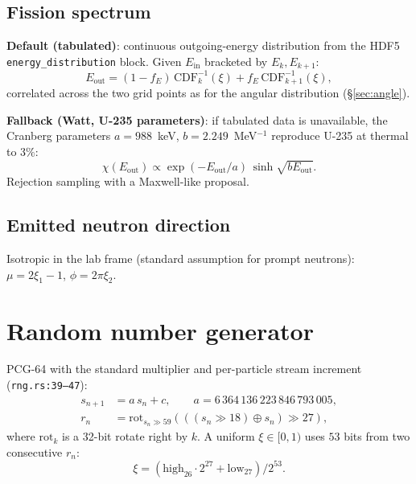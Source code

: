\documentclass[11pt,a4paper]{article}
\begin{document}
\subsection{Fission spectrum}

\textbf{Default (tabulated)}: continuous outgoing-energy
distribution from the HDF5 \texttt{energy\_distribution} block.
Given $E_\text{in}$ bracketed by $E_k, E_{k+1}$:
\begin{equation}
E_\text{out} = (1 - f_E)\,\mathrm{CDF}^{-1}_k(\xi) +
f_E\,\mathrm{CDF}^{-1}_{k+1}(\xi),
\end{equation}
correlated across the two grid points as for the angular
distribution (\S\ref{sec:angle}).

\textbf{Fallback (Watt, U-235 parameters)}: if tabulated data is
unavailable, the Cranberg parameters
$a = 988$~keV, $b = 2.249$~MeV$^{-1}$ reproduce U-235 at
thermal to $3\%$:
\begin{equation}
\chi(E_\text{out}) \propto \exp(-E_\text{out}/a)\,
\sinh\!\sqrt{b E_\text{out}}.
\end{equation}
Rejection sampling with a Maxwell-like proposal.

\subsection{Emitted neutron direction}

Isotropic in the lab frame (standard assumption for prompt
neutrons): $\mu = 2\xi_1 - 1$, $\phi = 2\pi\xi_2$.

\section{Random number generator}
\label{sec:rng}

PCG-64 with the standard multiplier and per-particle stream
increment (\texttt{rng.rs:39--47}):
\begin{equation}
\begin{aligned}
s_{n+1} &= a\, s_n + c, \qquad a = 6\,364\,136\,223\,846\,793\,005,\\
r_n &= \mathrm{rot}_{s_n \gg 59}\!\left(((s_n \gg 18) \oplus s_n) \gg 27\right),
\end{aligned}
\end{equation}
where $\mathrm{rot}_k$ is a 32-bit rotate right by $k$. A uniform
$\xi \in [0, 1)$ uses $53$ bits from two consecutive $r_n$:
\begin{equation}
\xi = (\mathrm{high}_{26} \cdot 2^{27} + \mathrm{low}_{27})/2^{53}.
\end{equation}
\end{document}
